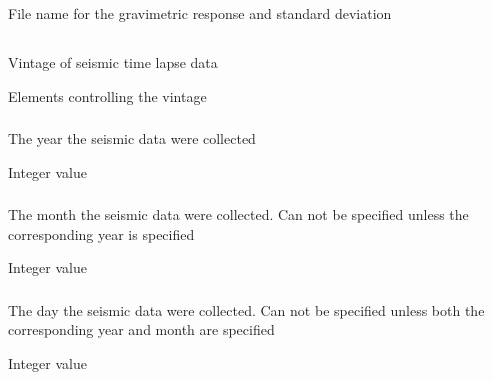 \subsubsection{}
 \slist
   \item \Description File name for the gravimetric response and standard deviation
   \item \Argument
   \item \Default
 \elist

\subsection{}
 \slist
   \item \Description Vintage of seismic time lapse data
   \item \Argument Elements controlling the vintage
   \item \Default
 \elist
 
 \subsubsection{}
 \slist
   \item \Description The year the seismic data were collected
   \item \Argument Integer value
   \item \Default 
 \elist

 \subsubsection{}
 \slist
   \item \Description The month the seismic data were collected. Can not be specified unless the corresponding year is specified
   \item \Argument Integer value
   \item \Default 
 \elist
 
  \subsubsection{}
 \slist
   \item \Description The day the seismic data were collected. Can not be specified unless both the corresponding year and month are specified
   \item \Argument Integer value
   \item \Default 
 \elist

